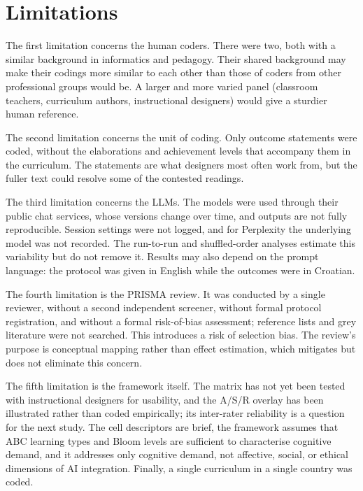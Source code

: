 \documentclass[journal,article,submit,pdftex,moreauthors]{Definitions/mdpi}
\begin{document}
\section{Limitations}
\label{sec:limitations}

The first limitation concerns the human coders. There were two, both with a similar background in informatics and pedagogy. Their shared background may make their codings more similar to each other than those of coders from other professional groups would be. A larger and more varied panel (classroom teachers, curriculum authors, instructional designers) would give a sturdier human reference.

The second limitation concerns the unit of coding. Only outcome statements were coded, without the elaborations and achievement levels that accompany them in the curriculum. The statements are what designers most often work from, but the fuller text could resolve some of the contested readings.

The third limitation concerns the LLMs. The models were used through their public chat services, whose versions change over time, and outputs are not fully reproducible. Session settings were not logged, and for Perplexity the underlying model was not recorded. The run-to-run and shuffled-order analyses estimate this variability but do not remove it. Results may also depend on the prompt language: the protocol was given in English while the outcomes were in Croatian.

The fourth limitation is the PRISMA review. It was conducted by a single reviewer, without a second independent screener, without formal protocol registration, and without a formal risk-of-bias assessment; reference lists and grey literature were not searched. This introduces a risk of selection bias. The review's purpose is conceptual mapping rather than effect estimation, which mitigates but does not eliminate this concern.

The fifth limitation is the framework itself. The matrix has not yet been tested with instructional designers for usability, and the A/S/R overlay has been illustrated rather than coded empirically; its inter-rater reliability is a question for the next study. The cell descriptors are brief, the framework assumes that ABC learning types and Bloom levels are sufficient to characterise cognitive demand, and it addresses only cognitive demand, not affective, social, or ethical dimensions of AI integration. Finally, a single curriculum in a single country was coded.
\end{document}

